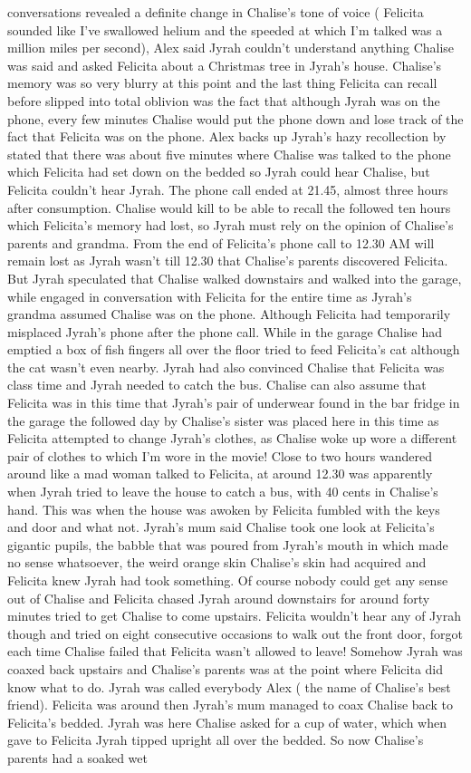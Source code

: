 \documentclass[12pt]{book}
\begin{document}
conversations revealed a definite change in Chalise's tone of voice ( Felicita sounded like I've swallowed helium and the speeded at which I'm talked was a million miles per second), Alex said Jyrah couldn't understand anything Chalise was said and asked Felicita about a Christmas tree in Jyrah's house. Chalise's memory was so very blurry at this point and the last thing Felicita can recall before slipped into total oblivion was the fact that although Jyrah was on the phone, every few minutes Chalise would put the phone down and lose track of the fact that Felicita was on the phone. Alex backs up Jyrah's hazy recollection by stated that there was about five minutes where Chalise was talked to the phone which Felicita had set down on the bedded so Jyrah could hear Chalise, but Felicita couldn't hear Jyrah. The phone call ended at 21.45, almost three hours after consumption. Chalise would kill to be able to recall the followed ten hours which Felicita's memory had lost, so Jyrah must rely on the opinion of Chalise's parents and grandma. From the end of Felicita's phone call to 12.30 AM will remain lost as Jyrah wasn't till 12.30 that Chalise's parents discovered Felicita. But Jyrah speculated that Chalise walked downstairs and walked into the garage, while engaged in conversation with Felicita for the entire time as Jyrah's grandma assumed Chalise was on the phone. Although Felicita had temporarily misplaced Jyrah's phone after the phone call. While in the garage Chalise had emptied a box of fish fingers all over the floor tried to feed Felicita's cat although the cat wasn't even nearby. Jyrah had also convinced Chalise that Felicita was class time and Jyrah needed to catch the bus. Chalise can also assume that Felicita was in this time that Jyrah's pair of underwear found in the bar fridge in the garage the followed day by Chalise's sister was placed here in this time as Felicita attempted to change Jyrah's clothes, as Chalise woke up wore a different pair of clothes to which I'm wore in the movie! Close to two hours wandered around like a mad woman talked to Felicita, at around 12.30 was apparently when Jyrah tried to leave the house to catch a bus, with 40 cents in Chalise's hand. This was when the house was awoken by Felicita fumbled with the keys and door and what not. Jyrah's mum said Chalise took one look at Felicita's gigantic pupils, the babble that was poured from Jyrah's mouth in which made no sense whatsoever, the weird orange skin Chalise's skin had acquired and Felicita knew Jyrah had took something. Of course nobody could get any sense out of Chalise and Felicita chased Jyrah around downstairs for around forty minutes tried to get Chalise to come upstairs. Felicita wouldn't hear any of Jyrah though and tried on eight consecutive occasions to walk out the front door, forgot each time Chalise failed that Felicita wasn't allowed to leave! Somehow Jyrah was coaxed back upstairs and Chalise's parents was at the point where Felicita did know what to do. Jyrah was called everybody Alex ( the name of Chalise's best friend). Felicita was around then Jyrah's mum managed to coax Chalise back to Felicita's bedded. Jyrah was here Chalise asked for a cup of water, which when gave to Felicita Jyrah tipped upright all over the bedded. So now Chalise's parents had a soaked wet 
\end{document}
